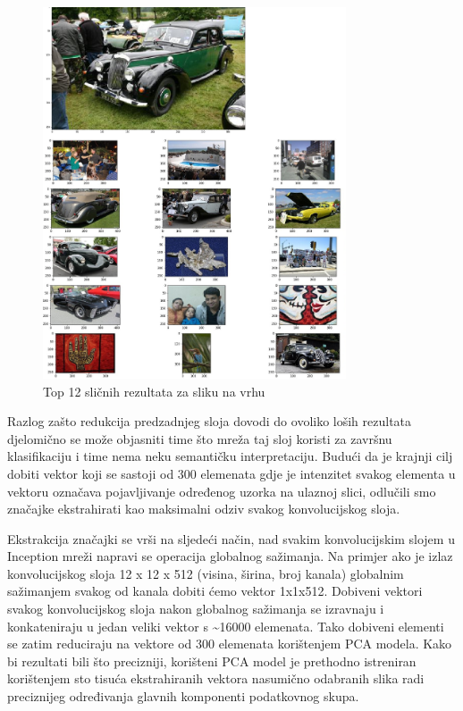 \documentclass[times, utf8, proizvoljni, numeric]{fer}
\begin{document}
\begin{figure}[H]
	\begin{center}
		\captionsetup{justification=centering}
		\includegraphics[width=0.8\textwidth]{./imgs/inception_zadnji_sloj_auti_greska.png}
		\caption{Top 12 sličnih rezultata za sliku na vrhu}
		\label{fg:inception_zadnji_sloj_auti_greska}
	\end{center}
\end{figure}

Razlog zašto redukcija predzadnjeg sloja dovodi do ovoliko loših rezultata djelomično se može objasniti time što mreža taj sloj koristi za završnu klasifikaciju i time nema neku semantičku interpretaciju. Budući da je krajnji cilj dobiti vektor koji se sastoji od 300 elemenata gdje je intenzitet svakog elementa u vektoru označava pojavljivanje određenog uzorka na ulaznoj slici, odlučili smo značajke ekstrahirati kao maksimalni odziv svakog konvolucijskog sloja. 

Ekstrakcija značajki se vrši na sljedeći način, nad svakim konvolucijskim slojem u Inception mreži napravi se operacija globalnog sažimanja. Na primjer ako je izlaz konvolucijskog sloja 12 x 12 x 512 (visina, širina, broj kanala) globalnim sažimanjem svakog od kanala dobiti ćemo vektor 1x1x512. Dobiveni vektori svakog konvolucijskog sloja nakon globalnog sažimanja se izravnaju i konkateniraju u jedan veliki vektor s  \textasciitilde16000 elemenata.  Tako dobiveni elementi se zatim reduciraju na vektore od 300 elemenata korištenjem PCA modela. Kako bi rezultati bili što precizniji, korišteni PCA model je prethodno istreniran korištenjem sto tisuća ekstrahiranih vektora nasumično odabranih slika radi preciznijeg određivanja glavnih komponenti podatkovnog skupa.
\end{document}
